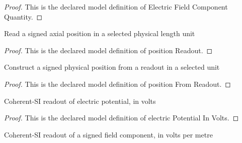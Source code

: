 \begin{proof}
  This is the declared model definition of Electric Field Component Quantity.
\end{proof}
\begin{definition}
  \label{def:physics:phyx-mini-0875:phyxminiproblems-problemphyxmini0875-positionreadout}
  Read a signed axial position in a selected physical length unit
\end{definition}
\begin{proof}
  This is the declared model definition of position Readout.
\end{proof}
\begin{definition}
  \label{def:physics:phyx-mini-0875:phyxminiproblems-problemphyxmini0875-positionfromreadout}
  Construct a signed physical position from a readout in a selected unit
\end{definition}
\begin{proof}
  This is the declared model definition of position From Readout.
\end{proof}
\begin{definition}
  \label{def:physics:phyx-mini-0875:phyxminiproblems-problemphyxmini0875-electricpotentialinvolts}
  Coherent-SI readout of electric potential, in volts
\end{definition}
\begin{proof}
  This is the declared model definition of electric Potential In Volts.
\end{proof}
\begin{definition}
  \label{def:physics:phyx-mini-0875:phyxminiproblems-problemphyxmini0875-electricfieldcomponentinvoltspermeter}
  Coherent-SI readout of a signed field component, in volts per metre
\end{definition}

